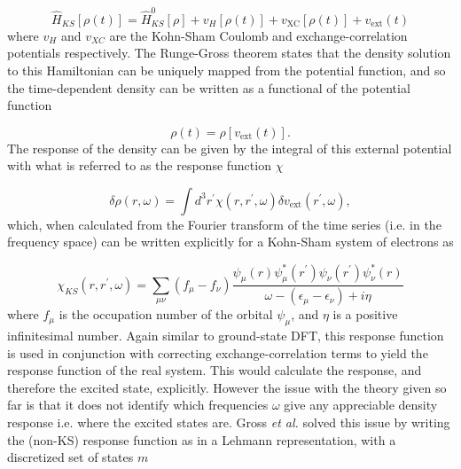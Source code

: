 \begin{equation}
\hat{H}_{KS}\left[\rho\left(t\right)\right] = \hat{H}^0_{KS}\left[\rho\right] + v_H\left[\rho\left(t\right)\right] + v_{\text{XC}}\left[\rho\left(t\right)\right] + v_{\text{ext}}\left(t\right)
\end{equation} 
%
where $v_H$ and $v_{XC}$ are the Kohn-Sham Coulomb and exchange-correlation potentials 
respectively. The Runge-Gross theorem states that the density solution to this Hamiltonian
can be uniquely mapped from the potential function, and so the time-dependent density 
can be written as a functional of the potential function

\begin{equation}
\rho\left(t\right) = \rho\left[v_{\text{ext}}\left(t\right)\right].
\end{equation}
%
The response of the density can be given by the integral of this external potential
with what is referred to as the response function $\chi$

\begin{equation}
    \delta \rho \left(r, \omega \right) = \int d^3 r^\prime \chi \left(r, r^\prime, \omega \right) \delta v_{\text{ext}} \left(r^\prime, \omega \right),
\end{equation}
%
which, when calculated from the Fourier transform of the time series (i.e. in the
frequency space) can be written explicitly for a Kohn-Sham system of electrons as

\begin{equation}
    \chi_{KS} \left(r, r^\prime, \omega \right) = \sum_{\mu\nu} \left(f_\mu - f_\nu \right) \frac{\psi_\mu\left(r\right)\psi^\ast_\mu\left(r^\prime\right) \psi_\nu\left(r^\prime\right) \psi^\ast_\nu\left(r\right)}{\omega - \left(\epsilon_\mu - \epsilon_\nu\right) + i\eta}
\end{equation}
%
where $f_\mu$ is the occupation number of the orbital $\psi_\mu$, and $\eta$ is a positive
infinitesimal number. Again similar to ground-state DFT, this response function 
is used in conjunction with correcting exchange-correlation terms to yield the response
function of the real system. This would calculate the response, and therefore the 
excited state, explicitly. However the issue with the theory given so far is that
it does not identify which frequencies $\omega$ give any appreciable density response
i.e. where the excited states are. Gross \emph{et al.} solved this issue by writing
the (non-KS) response function as in a Lehmann representation, with a discretized
set of states $m$

